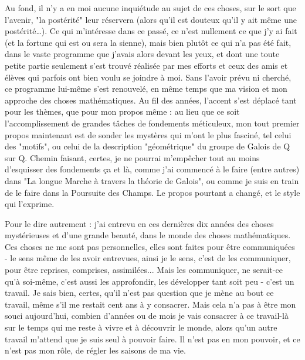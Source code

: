Au fond, il n'y a en moi aucune inquiétude au sujet de ces choses, sur le sort que l'avenir, "la postérité" leur réservera (alors qu'il est douteux qu'il y ait même une postérité…). Ce qui m’intéresse dans ce passé, ce n'est nullement ce que j'y ai fait (et la fortune qui est ou sera la sienne), mais bien plutôt ce qui n'a pas été fait, dans le vaste programme que j'avais alors devant les yeux, et dont une toute petite partie seulement s'est trouvé réalisée par mes efforts et ceux des amis et élèves qui parfois ont bien voulu se joindre à moi. Sans l'avoir prévu ni cherché, ce programme lui-même s'est renouvelé, en même temps que ma vision et mon approche des choses mathématiques. Au fil des années, l'accent s'est déplacé tant pour les thèmes, que pour mon propos même : au lieu que ce soit l'accomplissement de grandes tâches de fondements méticuleux, mon tout premier propos maintenant est de sonder les mystères qui m'ont le plus fasciné, tel celui des "motifs", ou celui de la description "géométrique" du groupe de Galois de Q sur Q. Chemin faisant, certes, je ne pourrai m'empêcher tout au moins d'esquisser des fondements ça et là, comme j'ai commencé à le faire (entre autres) dans "La longue Marche à travers la théorie de Galois", ou comme je suis en train de le faire dans la Poursuite des Champs. Le propos pourtant a changé, et le style qui l'exprime.

Pour le dire autrement : j'ai entrevu en ces dernières dix années des choses mystérieuses et d'une grande beauté, dans le monde des choses mathématiques. Ces choses ne me sont pas personnelles, elles sont faites pour être communiquées - le sens même de les avoir entrevues, ainsi je le sens, c'est de les communiquer, pour être reprises, comprises, assimilées... Mais les communiquer, ne serait-ce qu'à soi-même, c'est aussi les approfondir, les développer tant soit peu - c'est un travail. Je sais bien, certes, qu'il n'est pas question que je mène au bout ce travail, même s’il me restait cent ans à y consacrer. Mais cela n’a pas à être mon souci aujourd'hui, combien d'années ou de mois je vais consacrer à ce travail-là sur le temps qui me reste à vivre et à découvrir le monde, alors qu’un autre travail m’attend que je suis seul à pouvoir faire. Il n’est pas en mon pouvoir, et ce n'est pas mon rôle, de régler les saisons de ma vie.